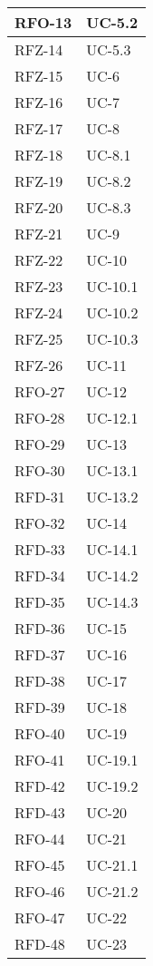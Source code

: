 \begin{xltabular}{\textwidth}{|X | X|}
    RFO-13 & UC-5.2 \\
    \hline
    RFZ-14 & UC-5.3 \\
    \hline
    RFZ-15 & UC-6 \\
    \hline
    RFZ-16 & UC-7 \\
    \hline
    RFZ-17 & UC-8 \\
    \hline
    RFZ-18 & UC-8.1 \\
    \hline
    RFZ-19 & UC-8.2 \\
    \hline
    RFZ-20 & UC-8.3 \\
    \hline
    RFZ-21 & UC-9 \\
    \hline
    RFZ-22 & UC-10 \\
    \hline
    RFZ-23 & UC-10.1 \\
    \hline
    RFZ-24 & UC-10.2 \\
    \hline
    RFZ-25 & UC-10.3 \\
    \hline
    RFZ-26 & UC-11 \\
    \hline
    RFO-27 & UC-12 \\
    \hline
    RFO-28 & UC-12.1 \\
    \hline
    RFO-29 & UC-13 \\
    \hline
    RFO-30 & UC-13.1 \\
    \hline
    RFD-31 & UC-13.2 \\
    \hline
    RFO-32 & UC-14 \\
    \hline
    RFD-33 & UC-14.1 \\
    \hline
    RFD-34 & UC-14.2 \\
    \hline
    RFD-35 & UC-14.3 \\
    \hline
    RFD-36 & UC-15 \\
    \hline
    RFD-37 & UC-16 \\
    \hline
    RFD-38 & UC-17 \\
    \hline
    RFD-39 & UC-18 \\
    \hline
    RFO-40 & UC-19 \\
    \hline
    RFO-41 & UC-19.1 \\
    \hline
    RFD-42 & UC-19.2 \\
    \hline
    RFD-43 & UC-20 \\
    \hline
    RFO-44 & UC-21 \\
    \hline
    RFO-45 & UC-21.1 \\
    \hline
    RFO-46 & UC-21.2\\
    \hline
    RFO-47 & UC-22 \\
    \hline
    RFD-48 & UC-23 \\

\end{xltabular}
